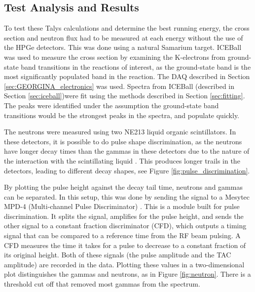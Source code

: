 

\subsection{Test Analysis and Results}

To test these Talys calculations and determine the best running energy, the cross section and neutron flux had to be measured at each energy without the use of the HPGe detectors. This was done using a natural Samarium target. ICEBall was used to measure the cross section by examining the K-electrons from ground-state band transitions in the reactions of interest, as the ground-state band is the most significantly populated band in the reaction. The DAQ described in Section \ref{sec:GEORGINA_electronics} was used. Spectra from ICEBall (described in Section \ref{sec:iceball})were fit using the methods described in Section \ref{sec:fitting}. The peaks were identified under the assumption the ground-state band transitions would be the strongest peaks in the spectra, and populate quickly. 

The neutrons were measured using two NE213 liquid organic scintillators. In these detectors, it is possible to do pulse shape discrimination, as the neutrons have longer decay times than the gammas in these detectors due to the nature of the interaction with the scintillating liquid \citep{knoll00:rad_det_meas}. This produces longer trails in the detectors, leading to different decay shapes, see Figure \ref{fig:pulse_discrimination}. 



By plotting the pulse height against the decay tail time, neutrons and gammas can be separated. In this setup, this was done by sending the signal to a Mesytec MPD-4 (Multi-channel Pulse Discriminator) \citep{mesytec:_PSD}. This is a module built for pulse discrimination. It splits the signal, amplifies for the pulse height, and sends the other signal to a constant fraction discriminator (CFD), which outputs a timing signal that can be compared to a reference time from the RF beam pulsing. A CFD measures the time it takes for a pulse to decrease to a constant fraction of its original height. Both of these signals (the pulse amplitude and the TAC amplitude) are recorded in the data. Plotting these values in a two-dimensional plot distinguishes the gammas and neutrons, as in Figure \ref{fig:neutron}. There is a threshold cut off that removed most gammas from the spectrum.

